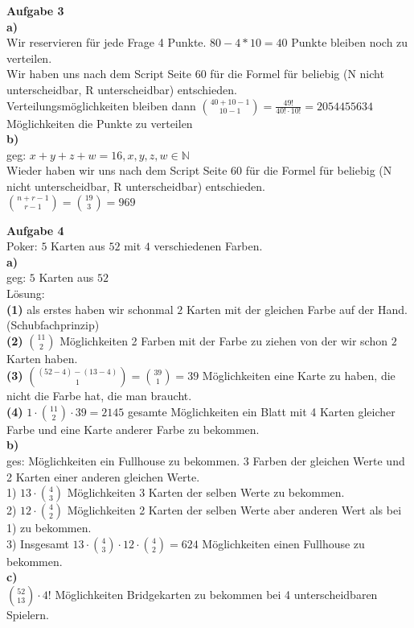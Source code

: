 \documentclass[a4paper]{scrartcl}
\begin{document}
	\begin{flushleft}
		\textbf{Aufgabe 3}\\
		\textbf{a)}\\
		Wir reservieren für jede Frage 4 Punkte. $80-4*10=40$ Punkte bleiben noch zu verteilen.\\
		Wir haben uns nach dem Script Seite 60 für die Formel für beliebig (N nicht unterscheidbar, R unterscheidbar) entschieden.\\
		Verteilungsmöglichkeiten bleiben dann $\binom{40+10-1}{10-1} = \frac{49!}{40!\cdot 10!}=2054455634$ Möglichkeiten die Punkte zu verteilen\\[1em]
		\textbf{b)} \\
		geg: $x+y+z+w=16, x,y,z,w\in \mathbb{N}$\\
		Wieder haben wir uns nach dem Script Seite 60 für die Formel für beliebig (N nicht unterscheidbar, R unterscheidbar) entschieden.\\
		$\binom{n+r-1}{r-1} = \binom{19}{3}=969$\\[1em]		
	\end{flushleft}
	\begin{flushleft}
		\textbf{Aufgabe 4}\\
		Poker: $5$ Karten aus $52$ mit $4$ verschiedenen Farben.\\[1em]
		\textbf{a)}\\
		geg: $5$ Karten aus $52$\\
		Lösung:\\
		\textbf{(1)} als erstes haben wir schonmal $2$ Karten mit der gleichen Farbe auf der Hand. (Schubfachprinzip)\\
		\textbf{(2)} $\binom{11}{2}$ Möglichkeiten 2 Farben mit der Farbe zu ziehen von der wir schon $2$ Karten haben.\\
		\textbf{(3)} $\binom{(52-4)-(13-4)}{1} = \binom{39}{1} = 39$ Möglichkeiten eine Karte zu haben, die nicht die Farbe hat, die man braucht.\\
		\textbf{(4)} $1\cdot\binom{11}{2}\cdot 39 = 2145$ gesamte Möglichkeiten ein Blatt mit 4 Karten gleicher Farbe und eine Karte anderer Farbe zu bekommen.\\[1em]

		\textbf{b)}\\
		ges: Möglichkeiten ein Fullhouse zu bekommen. 3 Farben der gleichen Werte und 2 Karten einer anderen gleichen Werte.\\[1em]
		1) $13\cdot\binom{4}{3}$ Möglichkeiten 3 Karten der selben Werte zu bekommen.\\
		2) $12\cdot\binom{4}{2}$ Möglichkeiten 2 Karten der selben Werte aber anderen Wert als bei 1) zu bekommen.\\
		3) Insgesamt $13\cdot\binom{4}{3}\cdot 12\cdot\binom{4}{2} = 624$ Möglichkeiten einen Fullhouse zu bekommen.\\[1em]		
		
		\textbf{c)}\\
		$\binom{52}{13}\cdot 4!$ Möglichkeiten Bridgekarten zu bekommen bei 4 unterscheidbaren Spielern.\\[1em]
	\end{flushleft}
\end{document}
